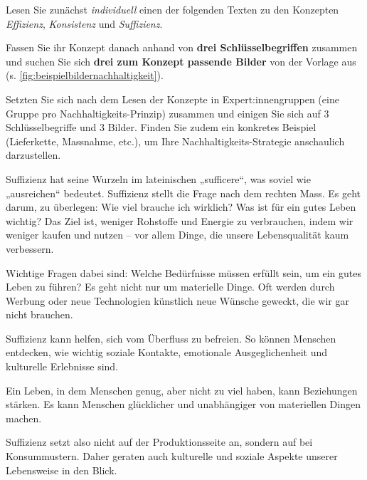 \begin{myexercise}
Lesen Sie zunächst \textit{individuell} einen der folgenden Texten zu den Konzepten \textit{Effizienz}, \textit{Konsistenz} und \textit{Suffizienz}.

Fassen Sie ihr Konzept danach anhand von \textbf{drei Schlüsselbegriffen} zusammen und suchen Sie sich \textbf{drei zum Konzept passende Bilder} von der Vorlage aus (s. \cref{fig:beispielbildernachhaltigkeit}).

Setzten Sie sich nach dem Lesen der Konzepte in Expert:innengruppen (eine Gruppe pro Nachhaltigkeits-Prinzip) zusammen und einigen Sie sich auf 3 Schlüsselbegriffe und 3 Bilder. Finden Sie zudem ein konkretes Beispiel (Lieferkette, Massnahme, etc.), um Ihre Nachhaltigkeits-Strategie anschaulich darzustellen.

\begin{textBox}[title = Suffizienz -- anders konsumieren für ein gutes Leben für alle \cite{suffizienz}]

Suffizienz hat seine Wurzeln im lateinischen „sufficere“, was soviel wie „ausreichen“ bedeutet. Suffizienz stellt die Frage nach dem rechten Mass. Es geht darum, zu überlegen: Wie viel brauche ich wirklich? Was ist für ein gutes Leben wichtig? Das Ziel ist, weniger Rohstoffe und Energie zu verbrauchen, indem wir weniger kaufen und nutzen – vor allem Dinge, die unsere Lebensqualität kaum verbessern.

Wichtige Fragen dabei sind: Welche Bedürfnisse müssen erfüllt sein, um ein gutes Leben zu führen? Es geht nicht nur um materielle Dinge. Oft werden durch Werbung oder neue Technologien künstlich neue Wünsche geweckt, die wir gar nicht brauchen. 

Suffizienz kann helfen, sich vom Überfluss zu befreien. So können Menschen entdecken, wie wichtig soziale Kontakte, emotionale Ausgeglichenheit und kulturelle Erlebnisse sind.

Ein Leben, in dem Menschen genug, aber nicht zu viel haben, kann Beziehungen stärken. Es kann Menschen glücklicher und unabhängiger von materiellen Dingen machen.

Suffizienz setzt also nicht auf der Produktionsseite an, sondern auf bei Konsummustern. Daher geraten auch kulturelle und soziale Aspekte unserer Lebensweise in den Blick.
\end{textBox}

\begin{textBox}[title = Konsistenz -- anders herstellen und
nutzen \cite{konsistenz}]


\end{textBox}
\end{myexercise}

